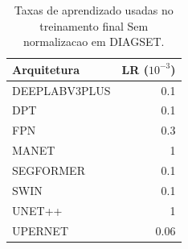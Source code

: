 \begin{table}[!htb]
\centering
\caption{Taxas de aprendizado usadas no treinamento final Sem normalizacao em DIAGSET.}
\label{tab:results_diagset-learning-rates-not_normalized}
\begin{minipage}[t]{0.52\textwidth}
\centering
\vspace{0pt}
\end{minipage}\hfill
\begin{minipage}[t]{0.40\textwidth}
\centering
\vspace{0pt}
\small
\begin{tabular}{lr}
\toprule
Arquitetura & LR ($10^{-3}$) \\
\midrule
DEEPLABV3PLUS & 0.1 \\
DPT & 0.1 \\
FPN & 0.3 \\
MANET & 1 \\
SEGFORMER & 0.1 \\
SWIN & 0.1 \\
UNET++ & 1 \\
UPERNET & 0.06 \\
\bottomrule
\end{tabular}
\end{minipage}
\end{table}
